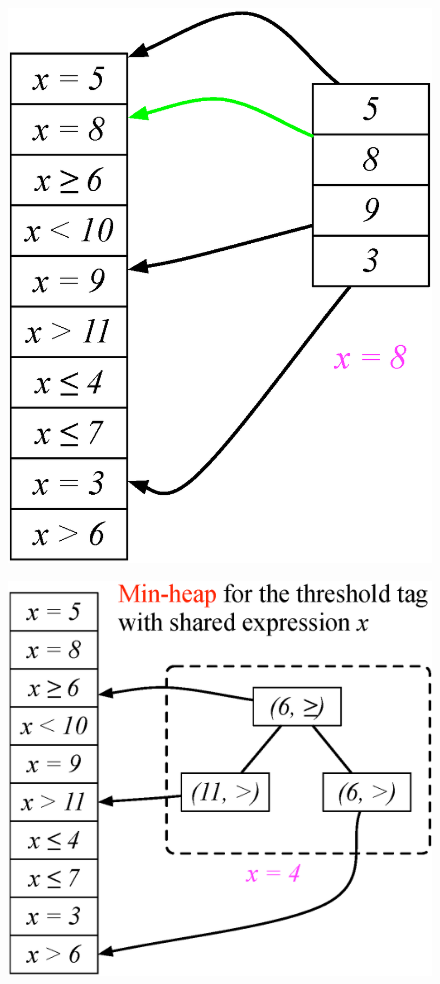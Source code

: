 \documentclass[mathserif,14pt,xcolor=table]{beamer}
\begin{document}
\begin{frame}
{\begin{figure}[ht!]
            \label{fig:fw}
        \end{figure}
    }
     {
        \begin{figure}[ht!]
            \centering
            \includegraphics[scale=0.50]{fig/tag_exp_4.eps}
            \label{fig:fw}
        \end{figure}
    }
     {
        \begin{figure}[ht!]
            \centering
            \includegraphics[scale=0.50]{fig/tag_exp_5.eps}

\end{figure}}
\end{frame}
\end{document}
